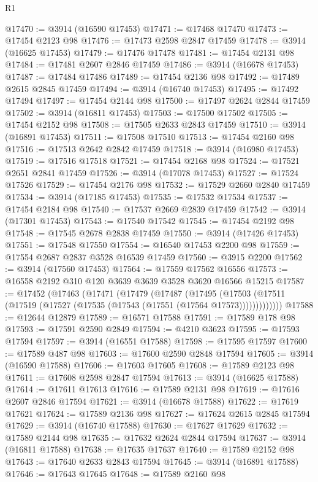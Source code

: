 \begin{lexlean}{R1}
\begin{coremodule}
@17470 := @3914 (@16590 @17453)
@17471 := @17468 @17470
@17473 := @17454 @2123 @98
@17476 := @17473 @2598 @2847 @17459
@17478 := @3914 (@16625 @17453)
@17479 := @17476 @17478
@17481 := @17454 @2131 @98
@17484 := @17481 @2607 @2846 @17459
@17486 := @3914 (@16678 @17453)
@17487 := @17484 @17486
@17489 := @17454 @2136 @98
@17492 := @17489 @2615 @2845 @17459
@17494 := @3914 (@16740 @17453)
@17495 := @17492 @17494
@17497 := @17454 @2144 @98
@17500 := @17497 @2624 @2844 @17459
@17502 := @3914 (@16811 @17453)
@17503 := @17500 @17502
@17505 := @17454 @2152 @98
@17508 := @17505 @2633 @2843 @17459
@17510 := @3914 (@16891 @17453)
@17511 := @17508 @17510
@17513 := @17454 @2160 @98
@17516 := @17513 @2642 @2842 @17459
@17518 := @3914 (@16980 @17453)
@17519 := @17516 @17518
@17521 := @17454 @2168 @98
@17524 := @17521 @2651 @2841 @17459
@17526 := @3914 (@17078 @17453)
@17527 := @17524 @17526
@17529 := @17454 @2176 @98
@17532 := @17529 @2660 @2840 @17459
@17534 := @3914 (@17185 @17453)
@17535 := @17532 @17534
@17537 := @17454 @2184 @98
@17540 := @17537 @2669 @2839 @17459
@17542 := @3914 (@17301 @17453)
@17543 := @17540 @17542
@17545 := @17454 @2192 @98
@17548 := @17545 @2678 @2838 @17459
@17550 := @3914 (@17426 @17453)
@17551 := @17548 @17550
@17554 := @16540 @17453 @2200 @98
@17559 := @17554 @2687 @2837 @3528 @16539 @17459
@17560 := @3915 @2200
@17562 := @3914 (@17560 @17453)
@17564 := @17559 @17562 @16556
@17573 := @16558 @2192 @310 @120 @3639 @3639 @3528 @3620 @16566 @15215
@17587 := @17452
    (@17463
      (@17471
        (@17479
          (@17487
            (@17495
              (@17503 (@17511 (@17519 (@17527 (@17535 (@17543 (@17551 (@17564 @17573)))))))))))))
@17588 := @12644 @12879
@17589 := @16571 @17588
@17591 := @17589 @178 @98
@17593 := @17591 @2590 @2849
@17594 := @4210 @3623
@17595 := @17593 @17594
@17597 := @3914 (@16551 @17588)
@17598 := @17595 @17597
@17600 := @17589 @487 @98
@17603 := @17600 @2590 @2848 @17594
@17605 := @3914 (@16590 @17588)
@17606 := @17603 @17605
@17608 := @17589 @2123 @98
@17611 := @17608 @2598 @2847 @17594
@17613 := @3914 (@16625 @17588)
@17614 := @17611 @17613
@17616 := @17589 @2131 @98
@17619 := @17616 @2607 @2846 @17594
@17621 := @3914 (@16678 @17588)
@17622 := @17619 @17621
@17624 := @17589 @2136 @98
@17627 := @17624 @2615 @2845 @17594
@17629 := @3914 (@16740 @17588)
@17630 := @17627 @17629
@17632 := @17589 @2144 @98
@17635 := @17632 @2624 @2844 @17594
@17637 := @3914 (@16811 @17588)
@17638 := @17635 @17637
@17640 := @17589 @2152 @98
@17643 := @17640 @2633 @2843 @17594
@17645 := @3914 (@16891 @17588)
@17646 := @17643 @17645
@17648 := @17589 @2160 @98

\end{coremodule}
\end{lexlean}
